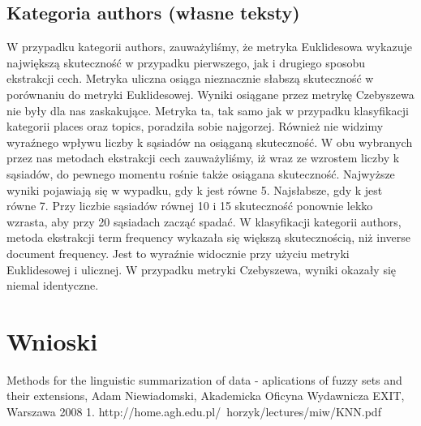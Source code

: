\documentclass{classrep}
\begin{document}
\subsection{Kategoria authors (własne teksty)}
	W przypadku kategorii authors, zauważyliśmy, że metryka Euklidesowa wykazuje największą skuteczność w przypadku pierwszego, jak i drugiego sposobu ekstrakcji cech. Metryka uliczna osiąga nieznacznie słabszą skuteczność w porównaniu do metryki Euklidesowej. Wyniki osiągane przez metrykę Czebyszewa nie były dla nas zaskakujące. Metryka ta, tak samo jak w przypadku klasyfikacji kategorii places oraz topics, poradziła sobie najgorzej. Również nie widzimy wyraźnego wpływu liczby k sąsiadów na osiąganą skuteczność. \newline
	W obu wybranych przez nas metodach ekstrakcji cech zauważyliśmy, iż wraz ze wzrostem liczby k sąsiadów, do pewnego momentu rośnie także osiągana skuteczność. Najwyższe wyniki pojawiają się w wypadku, gdy k jest równe 5. Najsłabsze, gdy k jest równe 7. Przy liczbie sąsiadów równej 10 i 15 skuteczność ponownie lekko wzrasta, aby przy 20 sąsiadach zacząć spadać.\newline
	W klasyfikacji kategorii authors, metoda ekstrakcji term frequency wykazała się większą skutecznością, niż inverse document frequency. Jest to wyraźnie widocznie przy użyciu metryki Euklidesowej i ulicznej. W przypadku metryki Czebyszewa, wyniki okazały się niemal identyczne. 
	
\section{Wnioski}
	

\begin{thebibliography}{}
Methods for the linguistic summarization of data - aplications of fuzzy sets and their extensions, Adam Niewiadomski, Akademicka Oficyna Wydawnicza EXIT, Warszawa 2008
1. http://home.agh.edu.pl/~horzyk/lectures/miw/KNN.pdf
\end{thebibliography}
\end{document}

